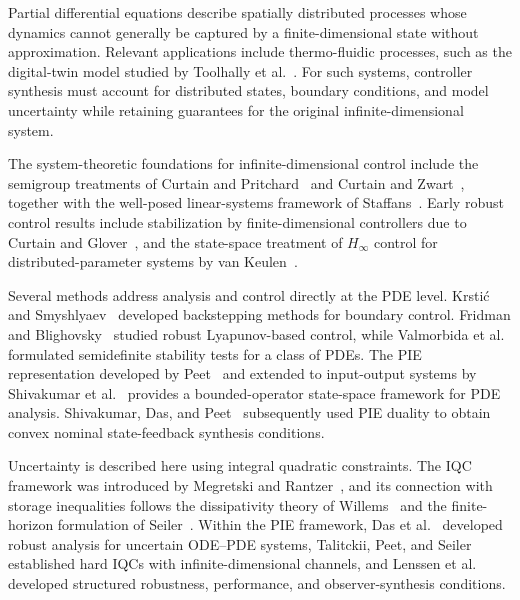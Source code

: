 Partial differential equations describe spatially distributed processes whose
dynamics cannot generally be captured by a finite-dimensional state without
approximation. Relevant applications include thermo-fluidic processes, such as
the digital-twin model studied by Toolhally et al.~\cite{TOOLHALLY2026103558}.
For such systems, controller synthesis must account for distributed states,
boundary conditions, and model uncertainty while retaining guarantees for the
original infinite-dimensional system.

The system-theoretic foundations for infinite-dimensional control include the
semigroup treatments of Curtain and Pritchard~\cite{curtain1978infinite} and
Curtain and Zwart~\cite{curtain1995introduction}, together with the well-posed
linear-systems framework of Staffans~\cite{staffans2005wellposed}. Early robust
control results include stabilization by finite-dimensional controllers due to
Curtain and Glover~\cite{curtain1986robust}, and the state-space treatment of
$H_\infty$ control for distributed-parameter systems by van
Keulen~\cite{vankeulen1993hinfinity}.

Several methods address analysis and control directly at the PDE level.
Krsti\'c and Smyshlyaev~\cite{krstic2008boundary} developed backstepping methods
for boundary control. Fridman and Blighovsky~\cite{fridman2012sampled} studied
robust Lyapunov-based control, while Valmorbida et
al.~\cite{valmorbida2016pdesdp} formulated semidefinite stability tests for a
class of PDEs. The PIE representation developed by
Peet~\cite{peet2021pierepresentation} and extended to input-output systems by
Shivakumar et al.~\cite{shivakumar2024GDPE} provides a bounded-operator
state-space framework for PDE analysis. Shivakumar, Das, and
Peet~\cite{shivaknew} subsequently used PIE duality to obtain convex nominal
state-feedback synthesis conditions.

Uncertainty is described here using integral quadratic constraints. The IQC
framework was introduced by Megretski and Rantzer~\cite{megretski1997system},
and its connection with storage inequalities follows the dissipativity theory
of Willems~\cite{willems1972dissipative1} and the finite-horizon formulation of
Seiler~\cite{6915700}. Within the PIE framework, Das et
al.~\cite{9303892} developed robust analysis for uncertain ODE--PDE systems,
Talitckii, Peet, and Seiler~\cite{10156335} established hard IQCs with
infinite-dimensional channels, and Lenssen et
al.~\cite{lenssen2025muanalysissynthesisframeworkpartial} developed structured
robustness, performance, and observer-synthesis conditions.

